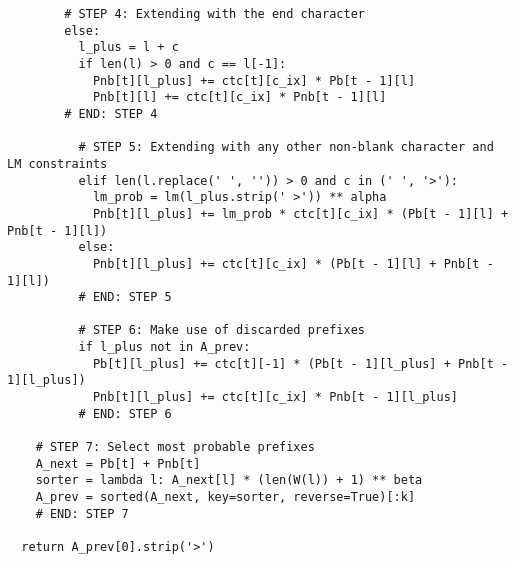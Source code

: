 \begin{lstlisting}
        # STEP 4: Extending with the end character
        else:
          l_plus = l + c
          if len(l) > 0 and c == l[-1]:
            Pnb[t][l_plus] += ctc[t][c_ix] * Pb[t - 1][l]
            Pnb[t][l] += ctc[t][c_ix] * Pnb[t - 1][l]
        # END: STEP 4

          # STEP 5: Extending with any other non-blank character and LM constraints
          elif len(l.replace(' ', '')) > 0 and c in (' ', '>'):
            lm_prob = lm(l_plus.strip(' >')) ** alpha
            Pnb[t][l_plus] += lm_prob * ctc[t][c_ix] * (Pb[t - 1][l] + Pnb[t - 1][l])
          else:
            Pnb[t][l_plus] += ctc[t][c_ix] * (Pb[t - 1][l] + Pnb[t - 1][l])
          # END: STEP 5

          # STEP 6: Make use of discarded prefixes
          if l_plus not in A_prev:
            Pb[t][l_plus] += ctc[t][-1] * (Pb[t - 1][l_plus] + Pnb[t - 1][l_plus])
            Pnb[t][l_plus] += ctc[t][c_ix] * Pnb[t - 1][l_plus]
          # END: STEP 6

    # STEP 7: Select most probable prefixes
    A_next = Pb[t] + Pnb[t]
    sorter = lambda l: A_next[l] * (len(W(l)) + 1) ** beta
    A_prev = sorted(A_next, key=sorter, reverse=True)[:k]
    # END: STEP 7

  return A_prev[0].strip('>')

\end{lstlisting}
